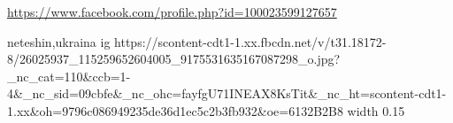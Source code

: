  
 
 
 
 

\url{https://www.facebook.com/profile.php?id=100023599127657}\par
neteshin,ukraina
\ifcmt
  ig https://scontent-cdt1-1.xx.fbcdn.net/v/t31.18172-8/26025937_115259652604005_9175531635167087298_o.jpg?_nc_cat=110&ccb=1-4&_nc_sid=09cbfe&_nc_ohc=fayfgU71INEAX8KsTit&_nc_ht=scontent-cdt1-1.xx&oh=9796c086949235de36d1ec5c2b3fb932&oe=6132B2B8
  width 0.15
\fi
